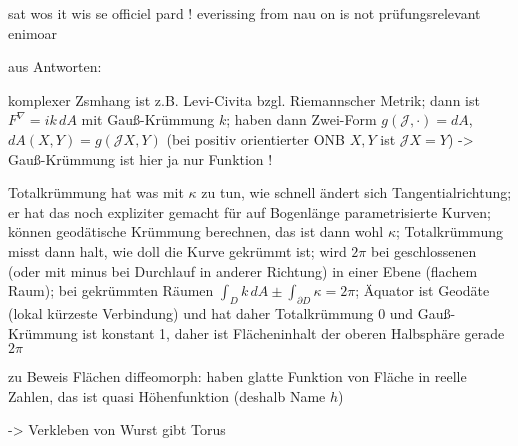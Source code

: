 \documentclass[../H_Analysis_main.tex]{subfiles}
\begin{document}
sat wos it wis se officiel pard ! everissing from nau on is not prüfungsrelevant enimoar




aus Antworten:

komplexer Zsmhang ist z.B. Levi-Civita bzgl. Riemannscher Metrik; dann ist $F^\nabla = i k \, dA$ mit Gauß-Krümmung $k$; haben dann Zwei-Form $g(\mathcal{J}, \cdot) = dA$, $dA(X, Y) = g(\mathcal{J}X, Y)$ (bei positiv orientierter ONB $X, Y$ ist $\mathcal{J}X = Y$) -> Gauß-Krümmung ist hier ja nur Funktion !

Totalkrümmung hat was mit $\kappa$ zu tun, wie schnell ändert sich Tangentialrichtung; er hat das noch expliziter gemacht für auf Bogenlänge parametrisierte Kurven; können geodätische Krümmung berechnen, das ist dann wohl $\kappa$; Totalkrümmung misst dann halt, wie doll die Kurve gekrümmt ist; wird $2\pi$ bei geschlossenen (oder mit minus bei Durchlauf in anderer Richtung) in einer Ebene (flachem Raum); bei gekrümmten Räumen $\int_D k \, dA \pm \int_{\partial D} \kappa = 2\pi$; Äquator ist Geodäte (lokal kürzeste Verbindung) und hat daher Totalkrümmung 0 und Gauß-Krümmung ist konstant 1, daher ist Flächeninhalt der oberen Halbsphäre gerade $2\pi$


zu Beweis Flächen diffeomorph: haben glatte Funktion von Fläche in reelle Zahlen, das ist quasi Höhenfunktion (deshalb Name $h$)


-> Verkleben von Wurst gibt Torus
\end{document}
